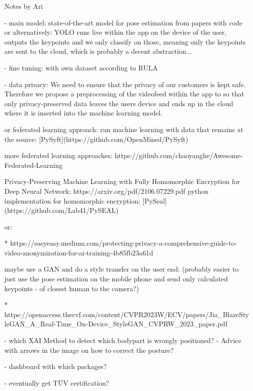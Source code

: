 
Notes by Ari

- main model:
state-of-the-art model for pose estimation from papers with code
or alternatively:
YOLO runs live within the app on the device of the user, outputs the keypoints and we only classify on those, meaning only the keypoints are sent to the cloud, which is probably a decent abstraction...

- fine tuning:
with own dataset according to RULA

- data privacy:
We need to ensure that the privacy of our customers is kept safe. Therefore we propose a preprocessing of the videofeed within the app to so that only privacy-preserved data leaves the users device and ends up in the cloud where it is inserted into the machine learning model.

or federated learning approach:
run machine learning with data that remains at the source:
[PySyft](https://github.com/OpenMined/PySyft)

more federated learning approaches:
https://github.com/chaoyanghe/Awesome-Federated-Learning

Privacy-Preserving Machine Learning with Fully Homomorphic Encryption for Deep Neural Network:
https://arxiv.org/pdf/2106.07229.pdf
python implementation for homomorphic encryption: [PySeal](https://github.com/Lab41/PySEAL)

or:

* https://easyeasy.medium.com/protecting-privacy-a-comprehensive-guide-to-video-anonymization-for-ai-training-4b85fb23a61d

maybe use a GAN and do a style transfer on the user end: (probably easier to just use the pose estimation on the mobile phone and send only calculated keypoints - of closest human to the camera?)

* https://openaccess.thecvf.com/content/CVPR2023W/ECV/papers/Jia_BlazeStyleGAN_A_Real-Time_On-Device_StyleGAN_CVPRW_2023_paper.pdf



- which XAI Method to detect which bodypart is wrongly positioned?
- Advice with arrows in the image on how to correct the posture?

- dashboard with which packages?

- eventually get TÜV certification?
